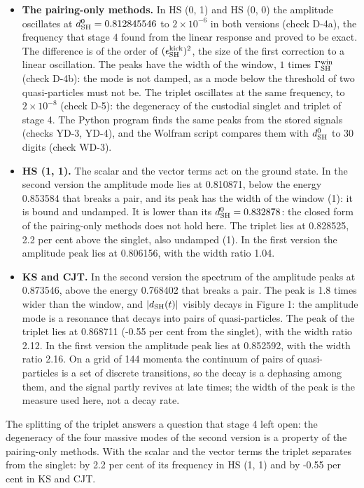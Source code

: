 \documentclass[
  10pt,
]{article}
\providecommand{\tightlist}{%
  \setlength{\itemsep}{0pt}\setlength{\parskip}{0pt}}
\begin{document}
\begin{itemize}
\tightlist
\item
  \textbf{The pairing-only methods.} In HS (0, 1) and HS (0, 0) the
  amplitude oscillates at \(d^0_{\rm SH}=0.812845546\) to
  \(2\times10^{-6}\) in both versions (check D-4a), the frequency that
  stage 4 found from the linear response and proved to be exact. The
  difference is of the order of \((\epsilon^{\rm kick}_{\rm SH})^2\),
  the size of the first correction to a linear oscillation. The peaks
  have the width of the window, \(1\) times
  \(\Gamma^{\rm win}_{\rm SH}\) (check D-4b): the mode is not damped, as
  a mode below the threshold of two quasi-particles must not be. The
  triplet oscillates at the same frequency, to \(2\times10^{-8}\) (check
  D-5): the degeneracy of the custodial singlet and triplet of stage 4.
  The Python program finds the same peaks from the stored signals
  (checks YD-3, YD-4), and the Wolfram script compares them with
  \(d^0_{\rm SH}\) to 30 digits (check WD-3).
\item
  \textbf{HS (1, 1).} The scalar and the vector terms act on the ground
  state. In the second version the amplitude mode lies at 0.810871,
  below the energy 0.853584 that breaks a pair, and its peak has the
  width of the window (1): it is bound and undamped. It is lower than
  its \(d^0_{\rm SH}=0.832878\): the closed form of the pairing-only
  methods does not hold here. The triplet lies at 0.828525, 2.2 per cent
  above the singlet, also undamped (1). In the first version the
  amplitude peak lies at 0.806156, with the width ratio 1.04.
\item
  \textbf{KS and CJT.} In the second version the spectrum of the
  amplitude peaks at 0.873546, above the energy 0.768402 that breaks a
  pair. The peak is 1.8 times wider than the window, and
  \(\lvert d_{\rm SH}(t)\rvert\) visibly decays in Figure 1: the
  amplitude mode is a resonance that decays into pairs of
  quasi-particles. The peak of the triplet lies at 0.868711 (-0.55 per
  cent from the singlet), with the width ratio 2.12. In the first
  version the amplitude peak lies at 0.852592, with the width ratio
  2.16. On a grid of 144 momenta the continuum of pairs of
  quasi-particles is a set of discrete transitions, so the decay is a
  dephasing among them, and the signal partly revives at late times; the
  width of the peak is the measure used here, not a decay rate.
\end{itemize}

The splitting of the triplet answers a question that stage 4 left open:
the degeneracy of the four massive modes of the second version is a
property of the pairing-only methods. With the scalar and the vector
terms the triplet separates from the singlet: by 2.2 per cent of its
frequency in HS (1, 1) and by -0.55 per cent in KS and CJT.
\end{document}
